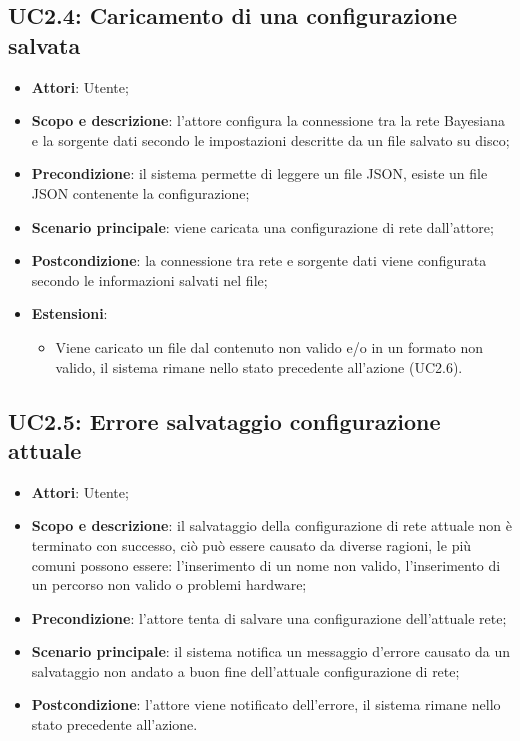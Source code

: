 \subsection{UC2.4: Caricamento di una configurazione salvata}
\hypertarget{UC2.4}{}
\begin{itemize}
	\item \textbf{Attori}: Utente;
	\item \textbf{Scopo e descrizione}: l'attore configura la connessione tra la rete Bayesiana e la sorgente dati secondo le impostazioni descritte da un file salvato su disco;
	\item \textbf{Precondizione}: il sistema permette di leggere un file JSON, esiste un file JSON contenente la configurazione;
	\item \textbf{Scenario principale}: viene caricata una configurazione di rete dall'attore;
	\item \textbf{Postcondizione}: la connessione tra rete e sorgente dati viene configurata secondo le informazioni salvati nel file;
	\item \textbf{Estensioni}: 
	\begin{itemize}
		\item  Viene caricato un file dal contenuto non valido e/o in un formato non valido, il sistema rimane nello stato precedente all'azione (UC2.6).
	\end{itemize}
\end{itemize}

\subsection{UC2.5: Errore salvataggio configurazione attuale}
\hypertarget{UC2.5}{}
\begin{itemize}
	\item \textbf{Attori}: Utente;
	\item \textbf{Scopo e descrizione}: il salvataggio della configurazione di rete attuale non è terminato con successo, ciò può essere causato da diverse ragioni, le più comuni possono essere: l'inserimento di un nome non valido, l'inserimento di un percorso non valido o problemi hardware;
	\item \textbf{Precondizione}: l'attore tenta di salvare una configurazione dell'attuale rete;
	\item \textbf{Scenario principale}: il sistema notifica un messaggio d'errore causato da un salvataggio non andato a buon fine dell'attuale configurazione di rete;
	\item \textbf{Postcondizione}: l'attore viene notificato dell'errore, il sistema rimane nello stato precedente all'azione.
\end{itemize}


